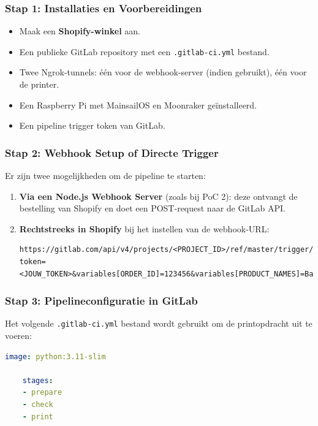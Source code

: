 \begin{enumerate}
\subsubsection{Stap 1: Installaties en Voorbereidingen}
\begin{itemize}
    \item Maak een \textbf{Shopify-winkel} aan.
    \item Een publieke GitLab repository met een \texttt{.gitlab-ci.yml} bestand.
    \item Twee Ngrok-tunnels: één voor de webhook-server (indien gebruikt), één voor de printer.
    \item Een Raspberry Pi met MainsailOS en Moonraker geïnstalleerd.
    \item Een pipeline trigger token van GitLab.
\end{itemize}

\subsubsection{Stap 2: Webhook Setup of Directe Trigger}
Er zijn twee mogelijkheden om de pipeline te starten:
\begin{enumerate}
    \item \textbf{Via een Node.js Webhook Server} (zoals bij PoC 2): deze ontvangt de bestelling van Shopify en doet een POST-request naar de GitLab API.
    \item \textbf{Rechtstreeks in Shopify} bij het instellen van de webhook-URL:
    \begin{lstlisting}[language=text, caption=Voorbeeld GitLab trigger-URL]
        https://gitlab.com/api/v4/projects/<PROJECT_ID>/ref/master/trigger/pipeline?token=<JOUW_TOKEN>&variables[ORDER_ID]=123456&variables[PRODUCT_NAMES]=Ballini%20Black%20Casual
    \end{lstlisting}
\end{enumerate}

\subsubsection{Stap 3: Pipelineconfiguratie in GitLab}
Het volgende \texttt{.gitlab-ci.yml} bestand wordt gebruikt om de printopdracht uit te voeren:

\begin{lstlisting}[language=yaml, caption=.gitlab-ci.yml structuur (vereenvoudigd)]
    image: python:3.11-slim
    
    stages:
    - prepare
    - check
    - print
    

\end{lstlisting}
\end{enumerate}
